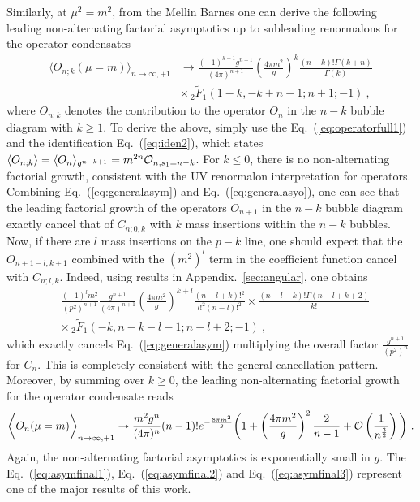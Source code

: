 \documentclass[a4paper,11pt]{article}
\begin{document}
Similarly, at $\mu^2=m^2$, from the Mellin Barnes one can derive the following leading non-alternating factorial asymptotics up to subleading renormalons for the operator condensates
\begin{align} \label{eq:generalasyo}
\bigg\langle O_{n;k}(\mu=m)\bigg\rangle_{n\rightarrow \infty,+1} & \rightarrow\frac{(-1)^{k+1}g^{n+1}}{(4\pi)^{n+1}} \left(\frac{4\pi m^2}{g}\right)^k\frac{ (n-k)! \Gamma (k+n)}{\Gamma (k)} \nonumber \\ 
& \times \, _2\tilde{F}_1(1-k,-k+n-1;n+1;-1) \ , 
\end{align}
where $O_{n;k}$ denotes the contribution to the operator $O_n$ in the $n-k$ bubble diagram with $k\ge 1$.  To derive the above, simply use the Eq.~(\ref{eq:operatorfull1}) and the identification Eq.~(\ref{eq:iden2}), which states $\langle O_{n;k}\rangle=\langle O_n\rangle_{g^{n-k+1}}=m^{2n}{\cal O}_{n,s_1=n-k}$. For $k\le 0$, there is no non-alternating factorial growth, consistent with the UV renormalon interpretation for operators. Combining Eq.~(\ref{eq:generalasym}) and Eq.~(\ref{eq:generalasyo}), one can see that the leading factorial growth of the operators $O_{n+1}$ in the $n-k$ bubble diagram exactly cancel that of $C_{n;0,k}$ with $k$ mass insertions within the $n-k$ bubbles. Now, if there are $l$ mass insertions on the $p-k$ line, one should expect that the $O_{n+1-l; k+1}$ combined with the $(m^2)^l$ term in the coefficient function cancel with $C_{n;l,k}$. Indeed, using results in Appendix.~\ref{sec:angular}, one obtains 
\begin{align}
& \frac{(-1)^lm^2}{(p^2)^{n+1}}\frac{g^{n+1}}{(4\pi)^{n+1}}\left(\frac{4\pi m^2}{g}\right)^{k+l}\frac{(n-l+k)!^2}{l!^2(n-l)!^2}\times \frac{(n-l-k)!\Gamma(n-l+k+2)}{k!} \nonumber \\ 
& \times \,_2\tilde F_1(-k,n-k-l-1;n-l+2;-1) \ ,
\end{align}
which exactly cancels Eq.~(\ref{eq:generalasym}) multiplying the overall factor $\frac{g^{n+1}}{(p^2)^n}$ for $C_n$.  This is completely consistent with the general cancellation pattern. Moreover, by summing over $k\ge 0$, the leading non-alternating factorial growth for the operator condensate reads 
\begin{align}\label{eq:asymfinal3}
\bigg\langle O_{n}(\mu=m)\bigg\rangle_{n\rightarrow \infty,+1}  \rightarrow\frac{m^2g^n}{(4\pi)^n}(n-1)!e^{-\frac{8\pi m^2}{g}}\bigg(1+\left(\frac{4\pi m^2}{g}\right)^2\frac{2}{n-1}+{\cal O}\left(\frac{1}{n^{\frac{3}{2}}}\right)\bigg) \ .
\end{align}
Again, the non-alternating factorial asymptotics is exponentially small in $g$. The Eq.~(\ref{eq:asymfinal1}), Eq.~(\ref{eq:asymfinal2}) and Eq.~(\ref{eq:asymfinal3}) represent one of the major results of this work.
\end{document}
